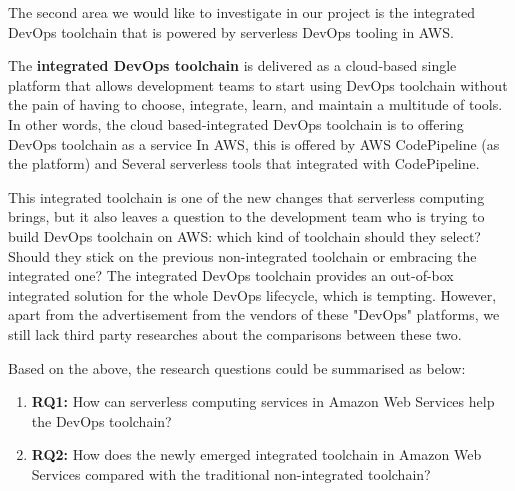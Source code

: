 \par
The second area we would like to investigate in our project is the integrated DevOps toolchain that is powered by serverless DevOps tooling in AWS. 
\par
The \textbf{integrated DevOps toolchain} is delivered as a cloud-based single platform that allows development teams to start using DevOps toolchain without the pain of having to choose, integrate, learn, and maintain a multitude of tools. In other words, the cloud based-integrated DevOps toolchain is to offering DevOps toolchain as a service
In AWS, this is offered by AWS CodePipeline (as the platform) and Several serverless tools that integrated with CodePipeline.
\par
This integrated toolchain is one of the new changes that serverless computing brings, but it also leaves a question to the development team who is trying to build DevOps toolchain on AWS: which kind of toolchain should they select? Should they stick on the previous non-integrated toolchain or embracing the integrated one? The integrated DevOps toolchain provides an out-of-box integrated solution for the whole DevOps lifecycle, which is tempting. However, apart from the advertisement from the vendors of these "DevOps" platforms, we still lack third party researches about the comparisons between these two. 
\par
Based on the above, the research questions could be summarised as below:
\begin{enumerate}
    \item \textbf{RQ1:} How can serverless computing services in Amazon Web Services help the DevOps toolchain?
    \item \textbf{RQ2:} How does the newly emerged integrated toolchain in Amazon Web Services compared with the traditional non-integrated toolchain?
\end{enumerate}
